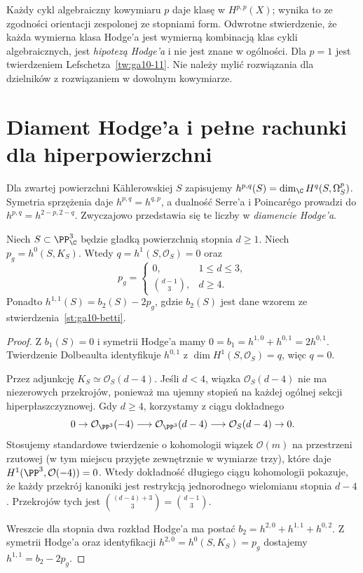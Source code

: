 \begin{uwaga}
Każdy cykl algebraiczny kowymiaru $p$ daje klasę
w $H^{p,p}(X)$; wynika to ze zgodności orientacji
zespolonej ze stopniami form. Odwrotne stwierdzenie,
że każda wymierna klasa Hodge'a jest wymierną kombinacją
klas cykli algebraicznych, jest \emph{hipotezą Hodge'a}
i nie jest znane w ogólności. Dla $p=1$ jest twierdzeniem
Lefschetza~\ref{tw:ga10-11}. Nie należy mylić
rozwiązania dla dzielników z rozwiązaniem
w dowolnym kowymiarze.
\end{uwaga}

\section{Diament Hodge'a i pełne rachunki dla hiperpowierzchni}
\label{sec:ga10-hodge-numbers}

Dla zwartej powierzchni Kählerowskiej $S$ zapisujemy
$h^{p,q}(S)=\dim_{\C}H^q(S,\Omega^p_S)$.
Symetria sprzężenia daje $h^{p,q}=h^{q,p}$,
a dualność Serre'a i Poincarégo prowadzi do
$h^{p,q}=h^{2-p,2-q}$. Zwyczajowo przedstawia się te
liczby w \emph{diamencie Hodge'a}.

\begin{stwierdzenie}
\label{st:ga10-hodge-hypersurf}
Niech $S\subset\PP^3_\C$ będzie gładką powierzchnią
stopnia $d\ge1$. Niech $p_g=h^0(S,K_S)$.
Wtedy $q=h^1(S,\mathcal O_S)=0$ oraz
\[
 p_g=\begin{cases}0,&1\le d\le3,\\
 \binom{d-1}{3},&d\ge4.\end{cases}
\]
Ponadto $h^{1,1}(S)=b_2(S)-2p_g$, gdzie
$b_2(S)$ jest dane wzorem ze
stwierdzenia~\ref{st:ga10-betti}.
\end{stwierdzenie}
\begin{proof}
Z $b_1(S)=0$ i symetrii Hodge'a mamy
$0=b_1=h^{1,0}+h^{0,1}=2h^{0,1}$.
Twierdzenie Dolbeaulta identyfikuje
$h^{0,1}$ z $\dim H^1(S,\mathcal O_S)=q$,
więc $q=0$.

Przez adjunkcję $K_S\simeq\mathcal O_S(d-4)$.
Jeśli $d<4$, wiązka $\mathcal O_S(d-4)$ nie ma
niezerowych przekrojów, ponieważ ma ujemny stopień
na każdej ogólnej sekcji hiperpłaszczyznowej.
Gdy $d\ge4$, korzystamy z ciągu dokładnego
\[
 0\to\mathcal O_{\PP^3}(-4)\longrightarrow
 \mathcal O_{\PP^3}(d-4)\longrightarrow
 \mathcal O_S(d-4)\to0.
\]
Stosujemy standardowe twierdzenie o kohomologii wiązek
$\mathcal O(m)$ na przestrzeni rzutowej (w tym miejscu
przyjęte zewnętrznie w wymiarze trzy), które daje
$H^1(\PP^3,\mathcal O(-4))=0$. Wtedy dokładność
długiego ciągu kohomologii pokazuje, że każdy przekrój
kanoniki jest restrykcją jednorodnego wielomianu
stopnia $d-4$. Przekrojów tych jest
$\binom{(d-4)+3}{3}=\binom{d-1}{3}$.

Wreszcie dla stopnia dwa rozkład Hodge'a ma postać
$b_2=h^{2,0}+h^{1,1}+h^{0,2}$.
Z symetrii Hodge'a oraz identyfikacji
$h^{2,0}=h^0(S,K_S)=p_g$ dostajemy
$h^{1,1}=b_2-2p_g$.
\end{proof}

